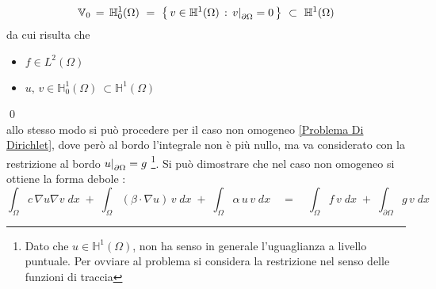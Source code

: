 \documentclass[12pt,a4paper]{report}
\theoremstyle{theorem}
\theoremstyle{theorem}
\theoremstyle{definition}
\newcommand\restr[2]{{%
  \left.\kern-\nulldelimiterspace %
  #1 %
  \right|_{#2} %
  }}
\begin{document}
\[  \mathbb{V}_{0} \, = \, \mathbb{H}_{0}^{1}(\Omega) \ = \ \left \{ \, v \in \mathbb{H}^{1}(\Omega) \, :  \, \restr{v}{\partial \Omega} = 0 \, \right \} \ \subset \  \mathbb{H}^1(\Omega) \]
da cui risulta che
\begin{itemize}
	\item $f \in L^{2}(\Omega)$
	\item $u, \, v \in \mathbb{H}_{0}^{1}(\Omega) \ \subset \mathbb{H}^{1}(\Omega)$
\end{itemize}
\qed
\hfill \\
allo stesso modo si può procedere per il caso non omogeneo \ref{Problema Di Dirichlet}, dove però al bordo l'integrale non è più nullo, ma va considerato con la restrizione al bordo $\restr{u}{\partial \Omega} = g$ \footnote{Dato che $u \in \mathbb{H}^{1}(\Omega)$, non ha senso in generale l'uguaglianza a livello puntuale. Per ovviare al problema si considera la restrizione nel senso delle funzioni di traccia}. Si può dimostrare che nel caso non omogeneo si ottiene la forma debole \label{Problema Ellittico Debole Non Omogeneo} :
\[ \int_{\Omega}{c \, \nabla u \nabla v \; dx} \; + \; \int_{\Omega}{(\beta \cdot \nabla u) \, v \; dx} \; + \; \int_{\Omega}{\alpha \, u \, v \; dx} \quad = \quad \int_{\Omega}{f \, v \; dx} \; + \; \int_{\partial\Omega}{g \, v \; dx}\]
\end{document}
